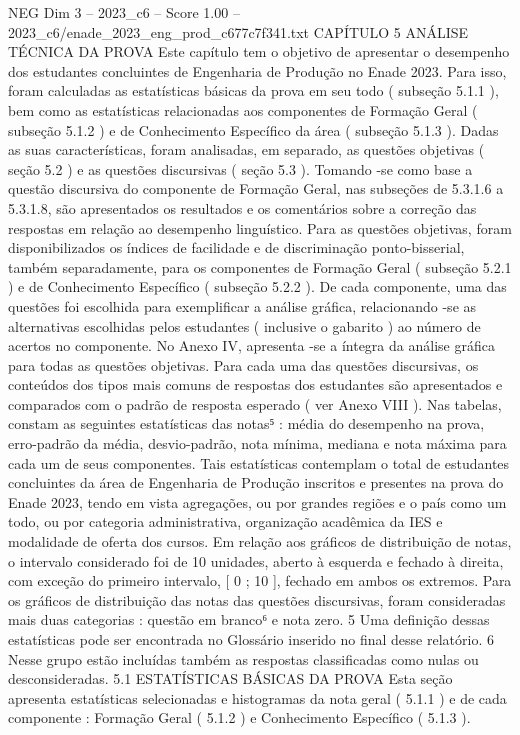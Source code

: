 \begin{textsample}{NEG Dim 3 – 2023\_c6 – Score 1.00 – 2023\_c6/enade\_2023\_eng\_prod\_c677c7f341.txt}  \label{ex:f3_neg_177}
CAPÍTULO 5 ANÁLISE TÉCNICA DA PROVA Este capítulo tem o objetivo de apresentar o desempenho dos estudantes concluintes de Engenharia de Produção no Enade 2023.
Para isso, foram calculadas as estatísticas básicas da prova em seu todo ( subseção 5.1.1 ), bem como as estatísticas relacionadas aos componentes de Formação Geral ( subseção 5.1.2 ) e de Conhecimento Específico da área ( subseção 5.1.3 ).
Dadas as suas características, foram analisadas, em separado, as questões objetivas ( seção 5.2 ) e as questões discursivas ( seção 5.3 ).
Tomando -se como base a questão discursiva do componente de Formação Geral, nas subseções de 5.3.1.6 a 5.3.1.8, são apresentados os resultados e os comentários sobre a correção das respostas em relação ao desempenho linguístico.
Para as questões objetivas, foram disponibilizados os índices de facilidade e de discriminação ponto-bisserial, também separadamente, para os componentes de Formação Geral ( subseção 5.2.1 ) e de Conhecimento Específico ( subseção 5.2.2 ).
De cada componente, uma das questões foi escolhida para exemplificar a análise gráfica, relacionando -se as alternativas escolhidas pelos estudantes ( inclusive o gabarito ) ao número de acertos no componente.
No Anexo IV, apresenta -se a íntegra da análise gráfica para todas as questões objetivas.
Para cada uma das questões discursivas, os conteúdos dos tipos mais comuns de respostas dos estudantes são apresentados e comparados com o padrão de resposta esperado ( ver Anexo VIII ).
Nas tabelas, constam as seguintes estatísticas das notas⁵ : média do desempenho na prova, erro-padrão da média, desvio-padrão, nota mínima, mediana e nota máxima para cada um de seus componentes.
Tais estatísticas contemplam o total de estudantes concluintes da área de Engenharia de Produção inscritos e presentes na prova do Enade 2023, tendo em vista agregações, ou por grandes regiões e o país como um todo, ou por categoria administrativa, organização acadêmica da IES e modalidade de oferta dos cursos.
Em relação aos gráficos de distribuição de notas, o intervalo considerado foi de 10 unidades, aberto à esquerda e fechado à direita, com exceção do primeiro intervalo, [ 0 ; 10 ], fechado em ambos os extremos.
Para os gráficos de distribuição das notas das questões discursivas, foram consideradas mais duas categorias : questão em branco⁶ e nota zero. 5 Uma definição dessas estatísticas pode ser encontrada no Glossário inserido no final desse relatório. 6 Nesse grupo estão incluídas também as respostas classificadas como nulas ou desconsideradas. 5.1 ESTATÍSTICAS BÁSICAS DA PROVA Esta seção apresenta estatísticas selecionadas e histogramas da nota geral ( 5.1.1 ) e de cada componente : Formação Geral ( 5.1.2 ) e Conhecimento Específico ( 5.1.3 ).

\end{textsample}
